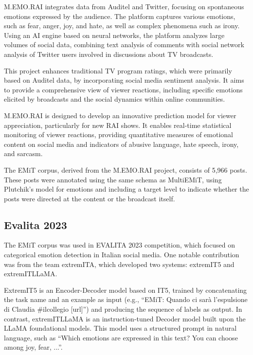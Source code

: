 \documentclass[letterpaper,journal]{IEEEtran}
\begin{document}
M.EMO.RAI integrates data from Auditel and Twitter, focusing on spontaneous emotions expressed by the audience. The platform captures various emotions, such as fear, anger, joy, and hate, as well as complex phenomena such as irony. Using an AI engine based on neural networks, the platform analyzes large volumes of social data, combining text analysis of comments with social network analysis of Twitter users involved in discussions about TV broadcasts.

This project enhances traditional TV program ratings, which were primarily based on Auditel data, by incorporating social media sentiment analysis. It aims to provide a comprehensive view of viewer reactions, including specific emotions elicited by broadcasts and the social dynamics within online communities.

M.EMO.RAI is designed to develop an innovative prediction model for viewer appreciation, particularly for new RAI shows. It enables real-time statistical monitoring of viewer reactions, providing quantitative measures of emotional content on social media and indicators of abusive language, hate speech, irony, and sarcasm.

The EMiT corpus, derived from the M.EMO.RAI project, consists of 5,966 posts. These posts were annotated using the same schema as MultiEMiT, using Plutchik's model for emotions and including a target level to indicate whether the posts were directed at the content or the broadcast itself.


\subsection{Evalita 2023}
The EMiT corpus was used in EVALITA 2023 competition, which focused on categorical emotion detection in Italian social media. One notable contribution was from the team extremITA, which developed two systems: extremIT5 and extremITLLaMA.

ExtremIT5 is an Encoder-Decoder model based on IT5, trained by concatenating the task name and an example as input (e.g., “EMiT: Quando ci sarà l’espulsione di Claudia \#ilcollegio [url]”) and producing the sequence of labels as output. In contrast, extremITLLaMA is an instruction-tuned Decoder model built upon the LLaMA foundational models. This model uses a structured prompt in natural language, such as “Which emotions are expressed in this text? You can choose among joy, fear, ...”.
\end{document}
